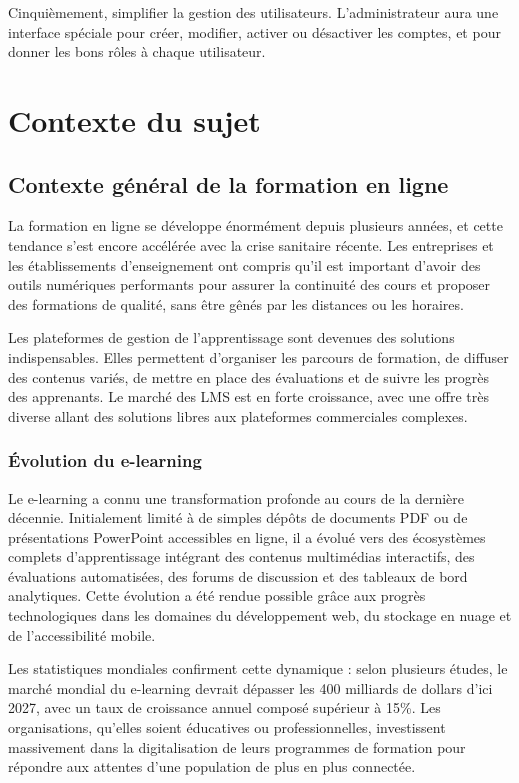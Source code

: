 \documentclass[12pt,a4paper]{report}
\begin{document}
Cinquièmement, simplifier la gestion des utilisateurs. L'administrateur aura une interface spéciale pour créer, modifier, activer ou désactiver les comptes, et pour donner les bons rôles à chaque utilisateur.

\section{Contexte du sujet}
\subsection{Contexte général de la formation en ligne}
La formation en ligne se développe énormément depuis plusieurs années, et cette tendance s'est encore accélérée avec la crise sanitaire récente. Les entreprises et les établissements d'enseignement ont compris qu'il est important d'avoir des outils numériques performants pour assurer la continuité des cours et proposer des formations de qualité, sans être gênés par les distances ou les horaires.

Les plateformes de gestion de l'apprentissage sont devenues des solutions indispensables. Elles permettent d'organiser les parcours de formation, de diffuser des contenus variés, de mettre en place des évaluations et de suivre les progrès des apprenants. Le marché des LMS est en forte croissance, avec une offre très diverse allant des solutions libres aux plateformes commerciales complexes.

\subsubsection*{Évolution du e-learning}
Le e-learning a connu une transformation profonde au cours de la dernière décennie. Initialement limité à de simples dépôts de documents PDF ou de présentations PowerPoint accessibles en ligne, il a évolué vers des écosystèmes complets d'apprentissage intégrant des contenus multimédias interactifs, des évaluations automatisées, des forums de discussion et des tableaux de bord analytiques. Cette évolution a été rendue possible grâce aux progrès technologiques dans les domaines du développement web, du stockage en nuage et de l'accessibilité mobile.

Les statistiques mondiales confirment cette dynamique : selon plusieurs études, le marché mondial du e-learning devrait dépasser les 400 milliards de dollars d'ici 2027, avec un taux de croissance annuel composé supérieur à 15\%. Les organisations, qu'elles soient éducatives ou professionnelles, investissent massivement dans la digitalisation de leurs programmes de formation pour répondre aux attentes d'une population de plus en plus connectée.
\end{document}
